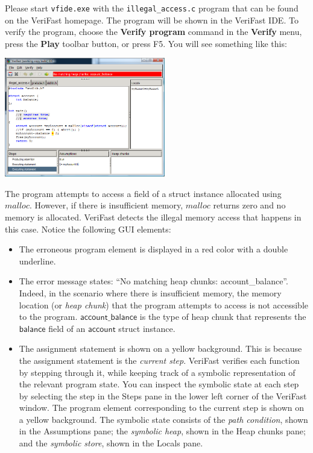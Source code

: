 \documentclass{article}
\begin{document}
Please start \texttt{vfide.exe} with the
\texttt{illegal\_access.c} program that can be found on the VeriFast homepage. The program will be shown
in the VeriFast IDE. To verify the program, choose the
\textbf{Verify program} command in the \textbf{Verify} menu,
press the \textbf{Play} toolbar button, or press F5. You will
see something like this:
\begin{center}
\includegraphics[width=7cm]{illegal_access.png}
\end{center}
The program attempts to access a field of a struct instance
allocated using $\mathit{malloc}$. However, if there is
insufficient memory, $\mathit{malloc}$ returns zero and no
memory is allocated. VeriFast detects the illegal memory access
that happens in this case. Notice the following GUI elements:
\begin{itemize}
\item The erroneous program element is displayed in a red
    color with a double underline.
\item The error message states: ``No matching heap chunks:
    account\_balance''. Indeed, in the scenario where there
    is insufficient memory, the memory location (or
    \emph{heap chunk}) that the program attempts to access
    is not accessible to the program.
    $\mathsf{account\_balance}$ is the type of heap chunk
    that represents the $\mathsf{balance}$ field of an
    $\mathsf{account}$ struct instance.
\item The assignment statement is shown on a yellow
    background. This is because the assignment statement is
    the \emph{current step}. VeriFast verifies each
    function by stepping through it, while keeping track of
    a symbolic representation of the relevant program
    state. You can inspect the symbolic state at each step
    by selecting the step in the Steps pane in the lower
    left corner of the VeriFast window. The program element
    corresponding to the current step is shown on a yellow
    background. The symbolic state consists of the
    \emph{path condition}, shown in the Assumptions pane;
    the \emph{symbolic heap}, shown in the Heap chunks
    pane; and the \emph{symbolic store}, shown in the
    Locals pane.
\end{itemize}
\end{document}
